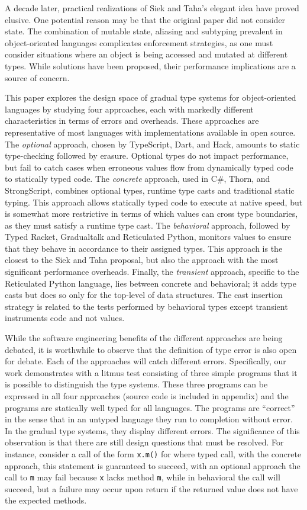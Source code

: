 \documentclass[runnningheads]{tex/llncs}
\newcommand{\code}[1]{{\tt #1}\xspace}
\begin{document}
A decade later, practical realizations of Siek and Taha's elegant idea have
proved elusive. One potential reason may be that the original paper did not
consider state. The combination of mutable state, aliasing and subtyping
prevalent in object-oriented languages complicates enforcement strategies,
as one must consider situations where an object is being accessed and
mutated at different types. While solutions have been proposed, their
performance implications are a source of concern.

This paper explores the design space of gradual type systems for
object-oriented languages by studying four approaches, each with markedly
different characteristics in terms of errors and overheads.  These
approaches are representative of most languages with implementations
available in open source. The \emph{optional} approach, chosen by
TypeScript, Dart, and Hack, amounts to static type-checking followed by
erasure. Optional types do not impact performance, but fail to catch cases
when erroneous values flow from dynamically typed code to statically typed
code.  The \emph{concrete} approach, used in C\#, Thorn, and StrongScript,
combines optional types, runtime type casts and traditional static
typing. This approach allows statically typed code to execute at native
speed, but is somewhat more restrictive in terms of which values can cross
type boundaries, as they must satisfy a runtime type cast. The
\emph{behavioral} approach, followed by Typed Racket, Gradualtalk and
Reticulated Python, monitors values to ensure that they behave in accordance
to their assigned types. This approach is the closest to the Siek and Taha
proposal, but also the approach with the most significant performance
overheads. Finally, the \emph{transient} approach, specific to the
Reticulated Python language, lies between concrete and behavioral; it adds
type casts but does so only for the top-level of data structures. The cast
insertion strategy is related to the tests performed by behavioral types
except transient instruments code and not values.

While the software engineering benefits of the different approaches are
being debated, it is worthwhile to observe that the definition of type error
is also open for debate.  Each of the approaches will catch different
errors. Specifically, our work demonstrates with a litmus test consisting of
three simple programs that it is possible to distinguish the type
systems. These three programs can be expressed in all four approaches
(source code is included in appendix) and the programs are statically well
typed for all languages. The programs are ``correct'' in the sense that in
an untyped language they run to completion without error. In the gradual
type systems, they display different errors.  The significance of this
observation is that there are still design questions that must be resolved.
For instance, consider a call of the form \code{x.m()} for where typed call,
with the concrete approach, this statement is guaranteed to succeed, with an
optional approach the call to \code{m} may fail because \code{x} lacks
method \code{m}, while in behavioral the call will succeed, but a failure
may occur upon return if the returned value does not have the expected
methods.
\end{document}
